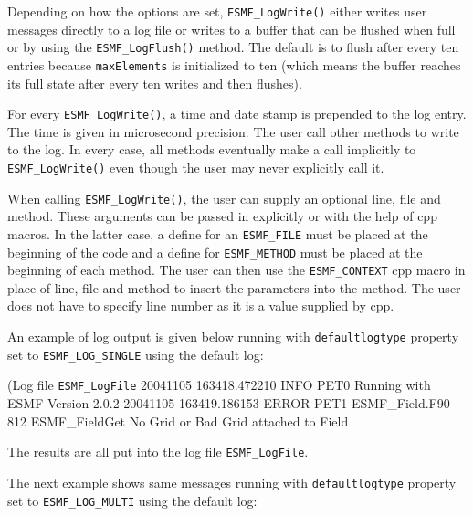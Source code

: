 Depending on how the options are set, {\tt ESMF\_LogWrite()} either writes user
messages directly to a log file or writes to a buffer that can be flushed when 
full or by using the {\tt ESMF\_LogFlush()} method.  The default is to flush 
after every ten entries because {\tt maxElements} is initialized to ten 
(which means the buffer reaches its full state after every ten writes and then
flushes).

For every {\tt ESMF\_LogWrite()}, a time and date stamp is prepended to the
log entry.  The time is given in microsecond precision.  The user call other 
methods to write to the log.  In every case, all methods eventually make a call
implicitly to {\tt ESMF\_LogWrite()} even though the user may never explicitly
call it.

When calling {\tt ESMF\_LogWrite()}, the user can supply an optional line,
file and method.  These arguments can be passed in explicitly or with the help
of cpp macros.  In the latter case, a define for an {\tt ESMF\_FILE} must be 
placed at the beginning of the code and a define for {\tt ESMF\_METHOD} must
be placed at the beginning of each method.  The user can then use the
{\tt ESMF\_CONTEXT} cpp macro in place of line, file and method to insert the 
parameters into the method.  The user does not have to specify line number as
it is a value supplied by cpp.

An example of log output is given below running with {\tt defaultlogtype} 
property set to {\tt ESMF\_LOG\_SINGLE} using the default log:

(Log file {\tt ESMF\_LogFile}
20041105 163418.472210 INFO      PET0     Running with ESMF Version 2.0.2   
20041105 163419.186153 ERROR     PET1     ESMF\_Field.F90             812  
ESMF\_FieldGet No Grid or Bad Grid attached to Field

The results are all put into the log file {\tt ESMF\_LogFile}.

The next example shows same messages running with {\tt defaultlogtype} 
property set to {\tt ESMF\_LOG\_MULTI} using the default log:

